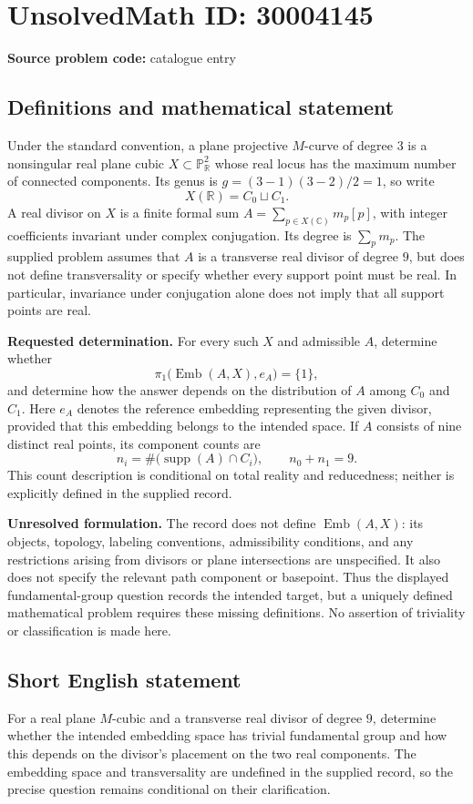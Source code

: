 \documentclass[11pt]{article}
\newcommand{\R}{\mathbb{R}}
\newcommand{\C}{\mathbb{C}}
\newcommand{\PP}{\mathbb{P}}
\begin{document}
\section*{UnsolvedMath ID: 30004145}
\textbf{Source problem code:} catalogue entry
\subsection{Definitions and mathematical statement}
Under the standard convention, a plane projective \(M\)-curve of degree \(3\) is a nonsingular real plane cubic \(X\subset\PP^2_{\R}\) whose real locus has the maximum number of connected components. Its genus is \(g=(3-1)(3-2)/2=1\), so write
\[
X(\R)=C_0\sqcup C_1.
\]
A real divisor on \(X\) is a finite formal sum \(A=\sum_{p\in X(\C)}m_p[p]\), with integer coefficients invariant under complex conjugation. Its degree is \(\sum_p m_p\). The supplied problem assumes that \(A\) is a transverse real divisor of degree \(9\), but does not define transversality or specify whether every support point must be real. In particular, invariance under conjugation alone does not imply that all support points are real.

\textbf{Requested determination.} For every such \(X\) and admissible \(A\), determine whether
\[
\pi_1\bigl(\operatorname{Emb}(A,X),e_A\bigr)=\{1\},
\]
and determine how the answer depends on the distribution of \(A\) among \(C_0\) and \(C_1\). Here \(e_A\) denotes the reference embedding representing the given divisor, provided that this embedding belongs to the intended space. If \(A\) consists of nine distinct real points, its component counts are
\[
n_i=\#\bigl(\operatorname{supp}(A)\cap C_i\bigr),\qquad n_0+n_1=9.
\]
This count description is conditional on total reality and reducedness; neither is explicitly defined in the supplied record.

\textbf{Unresolved formulation.} The record does not define \(\operatorname{Emb}(A,X)\): its objects, topology, labeling conventions, admissibility conditions, and any restrictions arising from divisors or plane intersections are unspecified. It also does not specify the relevant path component or basepoint. Thus the displayed fundamental-group question records the intended target, but a uniquely defined mathematical problem requires these missing definitions. No assertion of triviality or classification is made here.
\subsection{Short English statement}
For a real plane \(M\)-cubic and a transverse real divisor of degree \(9\), determine whether the intended embedding space has trivial fundamental group and how this depends on the divisor's placement on the two real components. The embedding space and transversality are undefined in the supplied record, so the precise question remains conditional on their clarification.
\end{document}
